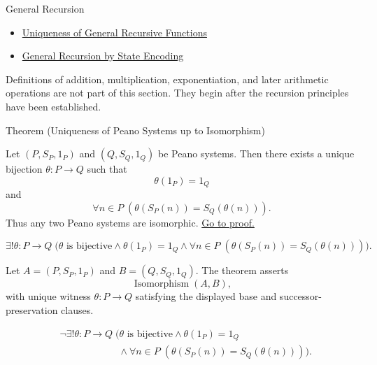 \begin{topicbox}{General Recursion}
\begin{dependencies}
\begin{itemize}
  \item \hyperref[lem:uniqueness-of-general-recursive-functions]{Uniqueness of General Recursive Functions}
  \item \hyperref[thm:general-recursion-by-state-encoding]{General Recursion by State Encoding}
\end{itemize}
\end{dependencies}

\begin{remark*}
Definitions of addition, multiplication, exponentiation, and later arithmetic
operations are not part of this section. They begin after the recursion
principles have been established.
\end{remark*}

\begin{theorembox}{Theorem (Uniqueness of Peano Systems up to Isomorphism)}
\begin{theorem}
\label{thm:uniqueness-of-peano-systems-up-to-isomorphism}
Let $(P,S_P,1_P)$ and $(Q,S_Q,1_Q)$ be Peano systems. Then there exists a
unique bijection $\theta:P\to Q$ such that
\[
\theta(1_P)=1_Q
\]
and
\[
\forall n\in P\;(\theta(S_P(n))=S_Q(\theta(n))).
\]
Thus any two Peano systems are isomorphic.
\hyperref[prf:uniqueness-of-peano-systems-up-to-isomorphism]{Go to proof.}
\end{theorem}
\end{theorembox}

\begin{remark*}
\[
\exists! \theta:P\to Q\;
\bigl(\theta \text{ is bijective}\land \theta(1_P)=1_Q
\land \forall n\in P\;(\theta(S_P(n))=S_Q(\theta(n)))\bigr).
\]
\end{remark*}

\begin{remark*}
Let $A=(P,S_P,1_P)$ and $B=(Q,S_Q,1_Q)$. The theorem asserts
\[
\operatorname{Isomorphism}(A,B),
\]
with unique witness $\theta:P\to Q$ satisfying the displayed base and
successor-preservation clauses.
\end{remark*}

\begin{remark*}
\[
\begin{aligned}
&\neg\exists! \theta:P\to Q\;
\bigl(\theta \text{ is bijective}\land \theta(1_P)=1_Q\\
&\qquad\qquad\qquad\land
\forall n\in P\;(\theta(S_P(n))=S_Q(\theta(n)))\bigr).
\end{aligned}
\]
\end{remark*}


\end{topicbox}
